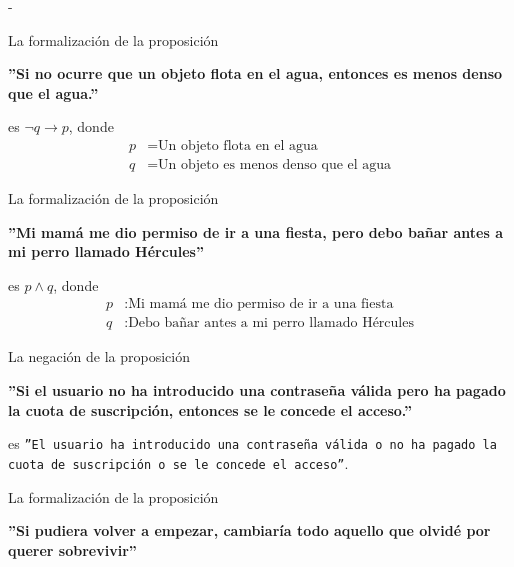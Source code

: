 \documentclass[12pt, a4paper]{exam}
\makeatletter
\renewenvironment{checkboxes}%
   {\setcounter{choice}{0}\list{\checkbox@char}%
      {%
        \settowidth{\leftmargin}{W.\hskip\labelsep\hskip 2.5em}%
        \def\choice{%
          \if@correctchoice
            \color@endgroup \endgroup
          \fi
          \stepcounter{choice}
          \item[\checked@char]
          \do@choice@pageinfo
        } %
        \def\CorrectChoice{%
          \if@correctchoice
            \color@endgroup \endgroup
          \fi
          \ifprintanswers
            \ifhmode \unskip\unskip\unvbox\voidb@x \fi
            \begingroup \color@begingroup \@correctchoicetrue
            \CorrectChoice@Emphasis
            \stepcounter{choice}
            \item[\checked@char]
          \else
            \stepcounter{choice}
            \item[\checked@char]
          \fi
          \do@choice@pageinfo
        } %
        \let\correctchoice\CorrectChoice
        \labelwidth\leftmargin\advance\labelwidth-\labelsep
        \topsep=0pt
        \partopsep=0pt
        \checkboxeshook
      }%
   }%
   {\if@correctchoice \color@endgroup \endgroup \fi \endlist}
\makeatother
\begin{document}
    \begin{questions}
        \begin{checkboxes}
            \choice La formalización de la proposición
            \begin{center}
                \textbf{''Si no ocurre que un objeto flota en el agua, 
                entonces es menos denso que el agua.''}
            \end{center}

            es $\neg q \rightarrow p$, donde 
            \begin{align*}
                p &= \text{Un objeto flota en el agua} \\ 
                q &= \text{Un objeto es menos denso que el agua} 
            \end{align*} %

            \choice La formalización de la proposición
            \begin{center}
                \textbf{''Mi mamá me dio permiso de ir a una fiesta, pero debo 
                bañar antes a mi perro llamado Hércules''}
            \end{center}

            es $p \land q$, donde 
            \begin{align*}
                p &: \text{Mi mamá me dio permiso de ir a una fiesta} \\ 
                q &: \text{Debo bañar antes a mi perro llamado Hércules}
            \end{align*}

            \choice La negación de la proposición
            \begin{center}
                \textbf{''Si el usuario no ha introducido una contraseña 
                válida pero ha pagado la cuota de suscripción, entonces se 
                le concede el acceso.''}
            \end{center}

            es \texttt{''El usuario ha introducido una contraseña válida o 
            no ha pagado la cuota de suscripción o se le concede el acceso''}.

            \choice La formalización de la proposición
            \begin{center}
                \textbf{''Si pudiera volver a empezar, cambiaría todo aquello 
                que olvidé por querer sobrevivir''}
            \end{center}


\end{checkboxes}
\end{questions}
\end{document}
